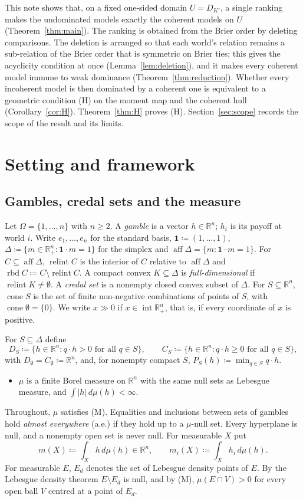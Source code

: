 \documentclass[11pt]{article}
\newcommand{\R}{\mathbb{R}}
\newcommand{\one}{\mathbf{1}}
\newcommand{\Rp}{\R^n_{+}}
\newcommand{\Rpp}{\inter\R^n_{+}}
\DeclareMathOperator{\cone}{cone}
\DeclareMathOperator{\relint}{relint}
\DeclareMathOperator{\rbd}{rbd}
\DeclareMathOperator{\aff}{aff}
\DeclareMathOperator{\inter}{int}
\theoremstyle{plain}
\theoremstyle{definition}
\theoremstyle{remark}
\begin{document}
This note shows that, on a fixed one-sided domain $U=D_{K'}$, a single ranking makes the
undominated models exactly the coherent models on $U$
(Theorem~\ref{thm:main}). The ranking is obtained from the Brier order by deleting
comparisons. The deletion is arranged so that each world's relation remains a
sub-relation of the Brier order that is symmetric on Brier ties; this gives the
acyclicity condition at once (Lemma~\ref{lem:deletion}), and it makes every coherent
model immune to weak dominance (Theorem~\ref{thm:reduction}). Whether every incoherent
model is then dominated by a coherent one is equivalent to a geometric condition (H) on
the moment map and the coherent hull (Corollary~\ref{cor:H}). Theorem~\ref{thm:H} proves
(H). Section~\ref{sec:scope} records the scope of the result and its limits.

\section{Setting and framework}\label{sec:framework}

\subsection{Gambles, credal sets and the measure}

Let $\Omega=\{1,\dots,n\}$ with $n\ge2$. A \emph{gamble} is a vector $h\in\R^n$; $h_i$ is
its payoff at world $i$. Write $e_1,\dots,e_n$ for the standard basis, $\one\coloneqq
(1,\dots,1)$, $\Delta\coloneqq\{m\in\Rp:\one\cdot m=1\}$ for the simplex and
$\aff\Delta=\{m:\one\cdot m=1\}$. For $C\subseteq\aff\Delta$, $\relint C$ is the interior
of $C$ relative to $\aff\Delta$ and $\rbd C\coloneqq C\setminus\relint C$. A compact
convex $K\subseteq\Delta$ is \emph{full-dimensional} if $\relint K\neq\emptyset$. A
\emph{credal set} is a nonempty closed convex subset of $\Delta$. For $S\subseteq\R^n$,
$\cone S$ is the set of finite non-negative combinations of points of $S$, with
$\cone\emptyset=\{0\}$. We write $x\gg0$ if $x\in\Rpp$, that is, if every coordinate of
$x$ is positive.

For $S\subseteq\Delta$ define
\[
  D_S\coloneqq\{h\in\R^n: q\cdot h>0\text{ for all }q\in S\},\qquad
  C_S\coloneqq\{h\in\R^n: q\cdot h\ge0\text{ for all }q\in S\},
\]
with $D_\emptyset=C_\emptyset\coloneqq\R^n$, and, for nonempty compact $S$,
$P_S(h)\coloneqq\min_{q\in S}q\cdot h$.

\begin{itemize}
  \item[(M)] $\mu$ is a finite Borel measure on $\R^n$ with the same null sets as Lebesgue
  measure, and $\int|h|\,d\mu(h)<\infty$.
\end{itemize}
Throughout, $\mu$ satisfies (M). Equalities and inclusions between sets of gambles hold
\emph{almost everywhere} (a.e.)
if they hold up to a $\mu$-null set. Every hyperplane is null, and a nonempty open set is
never null. For measurable $X$ put
\[
  m(X)\coloneqq\int_Xh\,d\mu(h)\in\R^n,\qquad m_i(X)\coloneqq\int_Xh_i\,d\mu(h).
\]
For measurable $E$, $E_d$ denotes the set of Lebesgue density points of $E$. By the
Lebesgue density theorem $E\setminus E_d$ is null, and by (M), $\mu(E\cap V)>0$ for
every open ball $V$ centred at a point of $E_d$.
\end{document}
